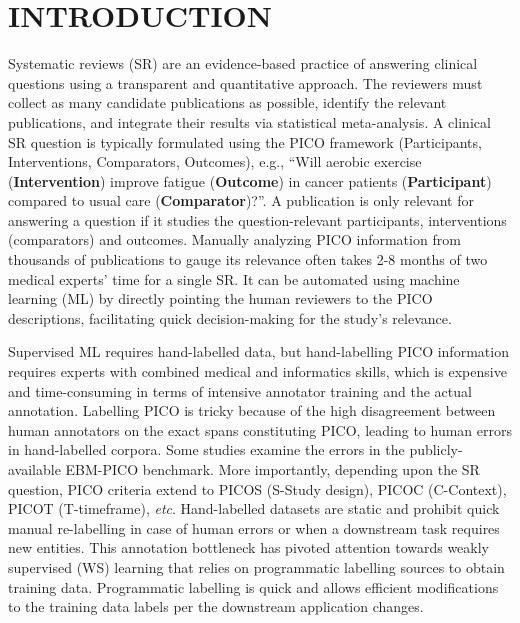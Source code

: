 \documentclass[10.7pt,]{article}
\begin{document}
\section{\textbf{INTRODUCTION}}\label{introduction}
%
Systematic reviews (SR) are an evidence-based practice of answering clinical questions using a transparent and quantitative approach.
The reviewers must collect as many candidate publications as possible, identify the relevant publications, and integrate their results via statistical meta-analysis.
A clinical SR question is typically formulated using the PICO framework (Participants, Interventions, Comparators, Outcomes), e.g., ``Will aerobic exercise (\textbf{Intervention}) improve fatigue (\textbf{Outcome}) in cancer patients (\textbf{Participant}) compared to usual care (\textbf{Comparator})?''.
A publication is only relevant for answering a question if it studies the question-relevant participants, interventions (comparators) and outcomes.\cite{uman2011systematic} 
Manually analyzing PICO information from thousands of publications to gauge its relevance often takes 2-8 months of two medical experts' time for a single SR.\cite{borah2017analysis}
It can be automated using machine learning (ML) by directly pointing the human reviewers to the PICO descriptions, facilitating quick decision-making for the study's relevance.


Supervised ML requires hand-labelled data, but hand-labelling PICO information requires experts with combined medical and informatics skills, which is expensive and time-consuming in terms of intensive annotator training and the actual annotation.
Labelling PICO is tricky because of the high disagreement between human annotators on the exact spans constituting PICO, leading to human errors in hand-labelled corpora.\cite{brockmeier2019improving}
Some studies examine the errors in the publicly-available EBM-PICO benchmark.\cite{nye2018corpus,abaho2019correcting,lee2019study}
More importantly, depending upon the SR question, PICO criteria extend to PICOS (S-Study design), PICOC (C-Context), PICOT (T-timeframe), \textit{etc}.\cite{riva2012your,methley2014pico,uman2011systematic}
Hand-labelled datasets are static and prohibit quick manual re-labelling in case of human errors or when a downstream task requires new entities.
This annotation bottleneck has pivoted attention towards weakly supervised (WS) learning that relies on programmatic labelling sources to obtain training data.
Programmatic labelling is quick and allows efficient modifications to the training data labels per the downstream application changes.
\end{document}
